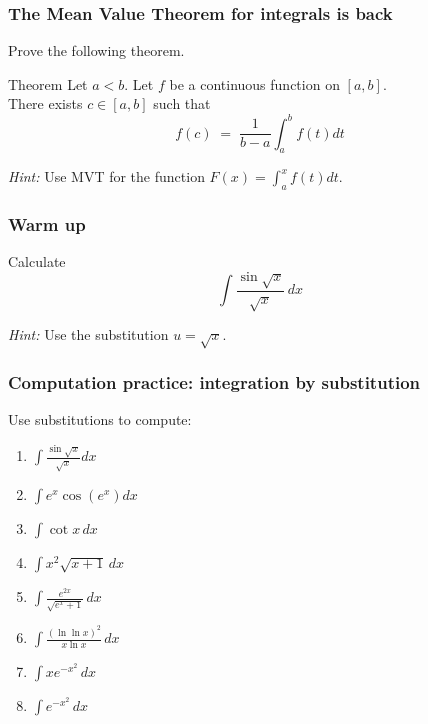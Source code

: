 \begin{frame}[t]
	\fontsize{13}{13}\selectfont
	\frametitle{The Mean Value Theorem for integrals is back}

	Prove the following theorem.

	\begin{block}{\fontsize{13}{13}\selectfont Theorem}
		Let $a < b$. Let $f$ be a continuous function on $[a,b]$. \\ There exists $c
		\in [a,b]$ such that
		\vspace{-.5cm}
		\[
			f(c) \; = \; \frac{1}{b-a}\int_{a}^{b}f(t) dt
		\]
	\end{block}


	\emph{Hint:} Use MVT for the function
	$\displaystyle F(x) = \int_{a}^{x}f(t) dt$.
\end{frame}

\begin{frame}[t]
	\frametitle{Warm up}

	Calculate
	\[
		\int \frac{\sin \sqrt{x}}{\sqrt{x}}\, dx
	\]

	\emph{Hint:} Use the substitution $\displaystyle u=\sqrt{x}$.
\end{frame}

\begin{frame}[t]
	\frametitle{Computation practice: integration by substitution}

	Use substitutions to compute:
	\begin{multicols}{2}
		\begin{enumerate}
			\item $\displaystyle \int \frac{\sin \sqrt{x}}{\sqrt{x}}dx$
				\vspace{.2cm}

			\item $\displaystyle \int e^{x}\cos \left(e^{x}\right) dx$
				\vspace{.2cm}

			\item $\displaystyle \int \cot x \, dx$
				\vspace{.2cm}

			\item $\displaystyle \int x^{2}\sqrt{x+1}\, dx$
				\vspace{.2cm}

			\item $\displaystyle \int \frac{e^{2x}}{\sqrt{e^{x}+ 1}}\, dx$
				\vspace{.2cm}

			\item $\displaystyle \int \frac{\left( \ln \ln x \right)^{2}}{ x \ln x}\, d
				x$
				\vspace{.2cm}

			\item $\displaystyle \int x e^{-x^2}\, dx$
				\vspace{.2cm}

			\item $\displaystyle \int e^{-x^2}\, dx$
				\vspace{.2cm}
		\end{enumerate}
	\end{multicols}
\end{frame}

